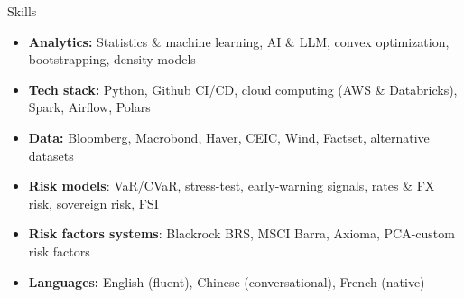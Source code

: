 \documentclass[usegeometry, 10pt, a4paper]{cv} %
\begin{document}
\newpage


\begin{rubriquetableau}[0.98\textwidth]{Skills}
  \vspace{-0.5cm}  
  \begin{itemize}
    \item \textbf{Analytics:} Statistics \& machine learning, AI \& LLM, convex optimization, bootstrapping, density models 
    \item \textbf{Tech stack:} Python, Github CI/CD, cloud computing (AWS \& Databricks), Spark, Airflow, Polars
    \item \textbf{Data:} Bloomberg, Macrobond, Haver, CEIC, Wind, Factset, alternative datasets
    \item \textbf{Risk models}: VaR/CVaR, stress-test, early-warning signals, rates \& FX risk, sovereign risk, FSI 
    \item \textbf{Risk factors systems}: Blackrock BRS, MSCI Barra, Axioma, PCA-custom risk factors
    \item \textbf{Languages:} English (fluent), Chinese (conversational), French (native) 
  \end{itemize}
  \end{rubriquetableau}


\end{document}

